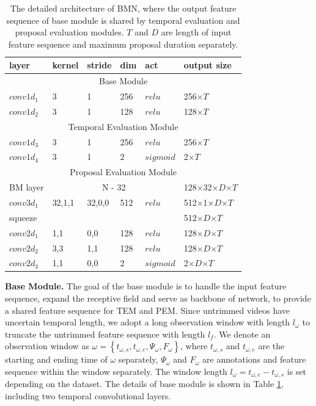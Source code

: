 \documentclass[10pt,twocolumn,letterpaper]{article}
\begin{document}
\begin{table}[tbp]
\centering
\caption{The detailed architecture of BMN, where the output feature sequence of base module is shared by temporal evaluation and proposal evaluation modules. $T$ and $D$ are length of input feature sequence and maximum proposal duration separately.   }
\small
\begin{tabular}{p{1.28cm}|p{0.6cm}p{0.6cm}p{0.3cm}p{1.0cm}|p{2.0cm}}
\hline
 layer & kernel & stride & dim & act & output size\\
\hline
\multicolumn{6}{c}{ Base Module} \\
\hline
 $conv1d_1$ & 3 &  1 &  256 & $relu$ & 256$\times T$\\
\hline
 $conv1d_2$ & 3 &  1 &  128 & $relu$ & 128$\times T$\\
\hline
\multicolumn{6}{c}{ Temporal Evaluation Module} \\
\hline
 $conv1d_3$ & 3 &  1 &  256 & $relu$ & 256$\times T$\\
\hline
 $conv1d_4$ &  3 &  1 &  2 & $sigmoid$  & 2$\times T$\\
\hline
\multicolumn{6}{c}{ Proposal Evaluation Module}\\
\hline
 BM layer & \multicolumn{4}{c|}{ N - 32}  & 128$\times$32$\times D$$\times T$\\
\hline
 $conv3d_1$ & 32,1,1 & 32,0,0 & 512 & $relu$  & 512$\times$1$\times D$$\times T$\\
\hline
 squeeze & & & & & 512$\times D$$\times T$\\
\hline
 $conv2d_1$ & 1,1 & 0,0 & 128 & $relu$   & 128$\times D$$\times T$\\
\hline
 $conv2d_2$ & 3,3 & 1,1 & 128 & $relu$   & 128$\times D$$\times T$\\
\hline 
 $conv2d_3$ & 1,1 & 0,0 & 2 & $sigmoid$  &  2$\times D$$\times T$\\
\hline
\end{tabular}
\label{table:bmn_layer}
\end{table}

\noindent
\textbf{Base Module.}
%
The goal of the base module is to handle the input feature sequence, expand the receptive field and serve as backbone of network, to provide a shared feature sequence for TEM and PEM.
%
Since untrimmed videos have uncertain temporal length, we adopt a long observation window with length $l_{\omega}$ to truncate the untrimmed feature sequence with length $l_f$.
%
We denote an observation window as  $\omega =\left \{ t_{\omega,s}, t_{\omega,e}, \Psi_{\omega}, F_{\omega}  \right \}$, where $t_{\omega,s}$ and $t_{\omega,e}$ are the starting and ending time of $\omega$ separately, $\Psi_{\omega}$ and $F_{\omega}$   are annotations and feature sequence  within the window separately.
%
The window length $l_{\omega} = t_{\omega,e} - t_{\omega,s}$ is set depending on the dataset.
%
The details of base module is shown in Table \ref{table:bmn_layer}, including two temporal convolutional layers.
\end{document}
